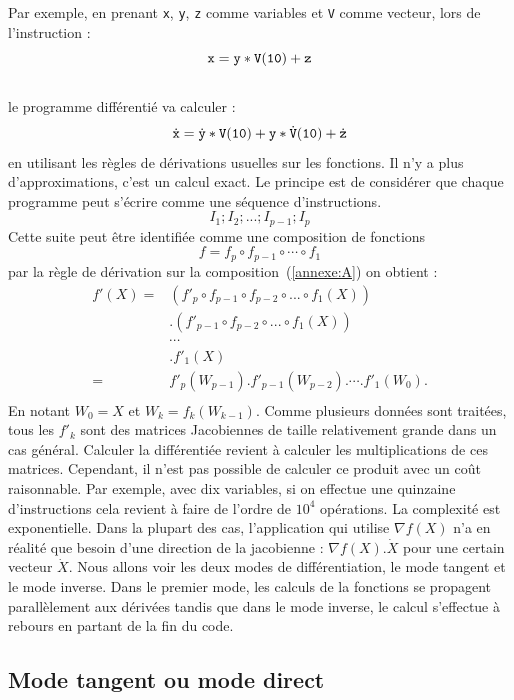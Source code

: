 Par exemple, en prenant {\tt x}, {\tt y}, {\tt z} comme variables et {\tt V} comme vecteur,
lors de l'instruction :\\
$${\tt x= y*V(10)+z}$$\\
le programme diff\'erenti\'e va  calculer :
$$\dot{\tt x}= \dot{\tt y}*{\tt V(10)} + {\tt y}*\dot{\tt V}{\tt(10)}+\dot{\tt z} $$
en utilisant les r\`egles de d\'erivations usuelles sur les fonctions. Il n'y a plus
d'approximations, c'est un calcul exact. 
Le principe est de consid\'erer que chaque programme peut s'\'ecrire comme une s\'equence
d'instructions.
$$I_1;I_2;...;I_{p-1};I_{p}$$
Cette suite peut être identifi\'ee comme une composition de fonctions 
$$f=f_p\circ f_{p-1} \circ \cdots \circ f_1$$
par la r\`egle de d\'erivation sur la composition~(\ref{annexe:A}) on obtient :\\

\begin{align*}
f'(X) = & (f'_p\circ f_{p-1} \circ f_{p-2} \circ ... \circ f_1(X))\\
& . (f'_{p-1} \circ f_{p-2} \circ ... \circ f_1(X))\\
& \cdots\\
& . f'_1(X)\\
= & f'_p(W_{p-1}) . f'_{p-1}(W_{p-2}) . \cdots .f'_1(W_0).\\
\end{align*}
En notant $W_0=X$ et $W_k=f_k(W_{k-1})$.
%
Comme plusieurs donn\'ees sont trait\'ees, tous les $f'_k$ sont des matrices Jacobiennes de 
taille relativement grande dans un cas g\'en\'eral. Calculer la diff\'erenti\'ee revient \`a calculer
les multiplications de ces matrices. Cependant, il n'est pas possible de calculer ce produit avec un co\^ut 
raisonnable. Par exemple, avec dix variables, si on effectue une quinzaine d'instructions
cela revient \`a faire de l'ordre de $10^4$ op\'erations. La complexit\'e est exponentielle. Dans la plupart
des cas, l'application qui utilise $\nabla f(X)$  n'a en r\'ealit\'e que besoin d'une direction de la jacobienne :
 $\nabla f(X).\dot{X}$ pour une certain vecteur $\dot{X}$.
Nous allons voir les deux modes de diff\'erentiation, le mode tangent et le mode inverse. Dans le premier mode, 
les calculs de la fonctions se propagent parall\`element aux d\'eriv\'ees tandis que dans le mode inverse, le calcul
s'effectue \`a rebours en partant de la fin du code.







    \subsection{Mode tangent ou mode direct}

